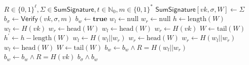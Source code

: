 \documentclass{article}
\begin{document}
\begin{algorithm}
\caption{$\mathsf{VerifySumSignature}: R,\Sigma,t , m \to \{\mathbf{true},\mathbf{false}\}$}\label{alg:VerifySumSignature}
\begin{algorithmic}[1]
\Require $ R \in \{0,1\}^\ell, \Sigma \in \mathsf{\hyperref[def:SumSignature]{SumSignature}}, t \in \mathbb{N}_0, m \in \{0,1\}^*$ 
\State $\mathsf{\hyperref[def:SumSignature]{SumSignature}}[vk,\sigma,W] \gets \Sigma$
\State $b_\sigma \gets \mathsf{\hyperref[def:Verify]{Verify}}(vk,\sigma,m)$
\State $b_w\gets \mathbf{true}$
    \State $w_l \gets \mathrm{null}$
    \State $w_r \gets \mathrm{null}$
    \State $h\gets \mathrm{length}(W)$
        \State $w_l \gets H(vk)$
        \State $w_r \gets \mathrm{head}(W)$
    \Else
        \State $w_l \gets \mathrm{head}(W)$
        \State $w_r \gets H(vk)$
    \EndIf
    \State $W \gets \mathrm{tail}(W)$
        \State $h^\prime \gets h - \mathrm{length}(W)$
            \State $w_l \gets H(w_l||w_r)$
            \State $w_r \gets \mathrm{head}(W)$
        \Else
            \State $w_r \gets H(w_l||w_r)$
            \State $w_l \gets \mathrm{head}(W)$
        \EndIf
        \State $W \gets \mathrm{tail}(W)$
    \EndWhile
    \State $b_w \gets  b_w \wedge R = H(w_l||w_r)$
\Else
    \State $b_w \gets  b_w \wedge R = H(vk)$
\EndIf
\State \Return $b_\sigma \wedge b_w$
\end{algorithmic}
\end{algorithm}



\newpage
\end{document}
